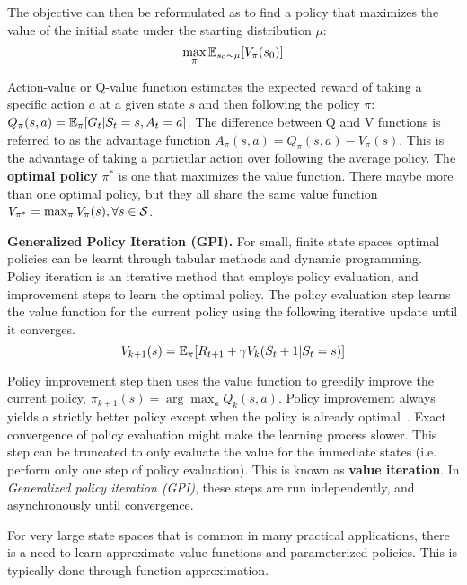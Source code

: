 The objective can then be reformulated as to find a policy that maximizes the value of the initial state under 
the starting distribution $\mu$:
$$\max_\pi \mathbb{E}_{s_0 \sim \mu}[V_{\pi}(s_0)]$$

Action-value or Q-value  function estimates the expected reward of taking a specific action $a$ at a given 
state $s$ and then following the policy $\pi$: $ Q_{\pi}(s, a) = \mathbb{E}_{\pi}[G_t | S_t = s, A_t = a] $.
The difference between Q and V functions is referred to as the advantage function $A_\pi(s,a) = Q_\pi(s,a) - V_\pi(s)$. 
This is the advantage of taking a particular action over following the average policy.
The \textbf{optimal policy} $\pi^{\ast}$ is one that maximizes the value function. There maybe more than one optimal policy, but 
they all share the same value function $V_{\pi^{\ast}} = \max_{\pi} V_\pi(s), \forall s \in \mathcal{S}$.

\textbf{Generalized Policy Iteration (GPI).} For small, finite state spaces optimal policies can be learnt through tabular methods and dynamic programming. 
Policy iteration is an iterative method that employs policy evaluation, and improvement steps to learn the optimal policy. 
The policy evaluation step learns the value function for the current policy using the following iterative update 
until it converges.
$$V_{k+1}(s) = \mathbb{E}_{\pi} [R_{t+1} + \gamma V_k(S_t+1 | S_t = s)]$$

Policy improvement step then uses the value function to greedily improve the current policy, $\pi_{k+1}(s) = \arg \max_a Q_{k}(s,a)$.
Policy improvement always yields a strictly better policy except when the policy is already optimal~\cite{suttonReinforcement2018}.
Exact convergence of policy evaluation might make the learning process slower. 
This step can be truncated to only evaluate the value for the immediate states (i.e. perform only one step of policy evaluation).
This is known as \textbf{value iteration}.
In \textit{Generalized policy iteration (GPI)}, these steps are run independently, and asynchronously until convergence.

For very large state spaces that is common in many practical applications, there is a need to learn approximate 
value functions and parameterized policies. This is typically done through function approximation. 


